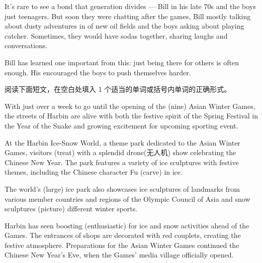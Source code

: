 \documentclass{英语试卷}
\begin{document}
\par It's rare to see a bond that  generation divides — Bill in his late 70s and the boys just teenagers. But soon they were chatting after the games, Bill mostly talking about dusty adventures in  of new oil fields and the boys asking about playing catcher. Sometimes, they would have sodas together, sharing laughs and  conversations.\par
\par Bill has learned one important  from this: just being there for others is often enough. His  encouraged the boys to push themselves harder.\par
{}
\par 阅读下面短文，在空白处填入 1 个适当的单词或括号内单词的正确形式。\par
\par With just over a week to go until the opening of the  (nine) Asian Winter Games, the streets of Harbin are alive with both the festive spirit of the Spring Festival in the Year of the Snake and growing excitement for  upcoming sporting event.\par
\par At the Harbin Ice-Snow World, a theme park dedicated to the Asian Winter Games, visitors  (treat) with a splendid drone(无人机) show celebrating the Chinese New Year. The park features a variety of ice sculptures with festive themes, including the Chinese character Fu  (carve) in ice.\par
\par The world's  (large) ice park also showcases ice sculptures of landmarks from various member countries and regions of the Olympic Council of Asia and snow sculptures  (picture) different winter sports.\par
\par Harbin has seen boosting  (enthusiastic) for ice and snow activities ahead of the Games. The entrances of shops are decorated with red couplets, creating the festive atmosphere. Preparations for the Asian Winter Games continued  the Chinese New Year's Eve, when the Games' media village officially opened.\par
\end{document}
